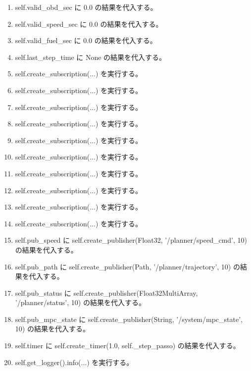 \documentclass[a4paper,11pt]{article}
\begin{document}
\begin{enumerate}[leftmargin=1.8em]
\item self.valid\_obd\_sec に 0.0 の結果を代入する。
\item self.valid\_speed\_sec に 0.0 の結果を代入する。
\item self.valid\_fuel\_sec に 0.0 の結果を代入する。
\item self.last\_step\_time に None の結果を代入する。
\item self.create\_subscription(...) を実行する。
\item self.create\_subscription(...) を実行する。
\item self.create\_subscription(...) を実行する。
\item self.create\_subscription(...) を実行する。
\item self.create\_subscription(...) を実行する。
\item self.create\_subscription(...) を実行する。
\item self.create\_subscription(...) を実行する。
\item self.create\_subscription(...) を実行する。
\item self.create\_subscription(...) を実行する。
\item self.create\_subscription(...) を実行する。
\item self.pub\_speed に self.create\_publisher(Float32, '/planner/speed\_cmd', 10) の結果を代入する。
\item self.pub\_path に self.create\_publisher(Path, '/planner/trajectory', 10) の結果を代入する。
\item self.pub\_status に self.create\_publisher(Float32MultiArray, '/planner/status', 10) の結果を代入する。
\item self.pub\_mpc\_state に self.create\_publisher(String, '/system/mpc\_state', 10) の結果を代入する。
\item self.timer に self.create\_timer(1.0, self.\_step\_passo) の結果を代入する。
\item self.get\_logger().info(...) を実行する。
            \end{enumerate}
\end{document}

